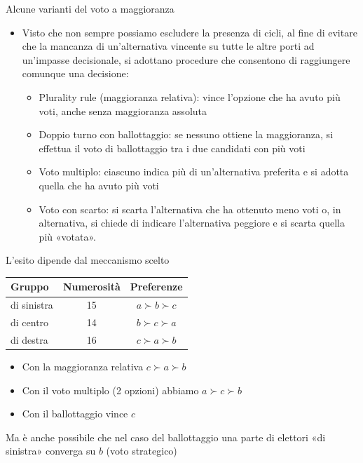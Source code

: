 \documentclass[11pt]{beamer}
\begin{document}
\begin{frame}{Alcune varianti del voto a maggioranza}
\begin{itemize}
\item Visto che non sempre possiamo escludere la presenza di cicli, al fine di
evitare che la mancanza di un'alternativa vincente su tutte le altre porti ad
un'impasse decisionale, si adottano procedure che consentono di raggiungere
comunque una decisione:
\begin{itemize}
\item \alert{Plurality rule (maggioranza relativa)}: vince l'opzione che ha avuto più
voti, anche senza maggioranza assoluta
\item \alert{Doppio turno con ballottaggio:} se nessuno ottiene la maggioranza, si
effettua il voto di ballottaggio tra i due candidati con più voti
\item \alert{Voto multiplo:} ciascuno indica più di un'alternativa preferita e si
adotta quella che ha avuto più voti
\item \alert{Voto con scarto:} si scarta l'alternativa che ha ottenuto meno voti o, in
alternativa, si chiede di indicare l'alternativa peggiore e si scarta
quella più «votata».
\end{itemize}
\end{itemize}
\end{frame}

\begin{frame}{L'esito dipende dal meccanismo scelto}
\begin{center}
  \begin{tabular}{lcc}\toprule
  Gruppo & Numerosità &Preferenze\\
  \midrule
  di sinistra & 15 & $a \succ b \succ c$ \\
  di centro & 14 & $b \succ c \succ a$\\
  di destra & 16 & $c \succ a \succ b$\\\bottomrule
  \end{tabular}
\end{center}

\begin{itemize}
\item Con la maggioranza relativa $c\succ a\succ b$
\item Con il voto multiplo (2 opzioni) abbiamo $a\succ c\succ b$
\item Con il ballottaggio vince $c$
\end{itemize}
Ma è anche possibile che nel caso del ballottaggio una parte di elettori «di
sinistra» converga su $b$ (voto strategico)
\end{frame}
\end{document}
